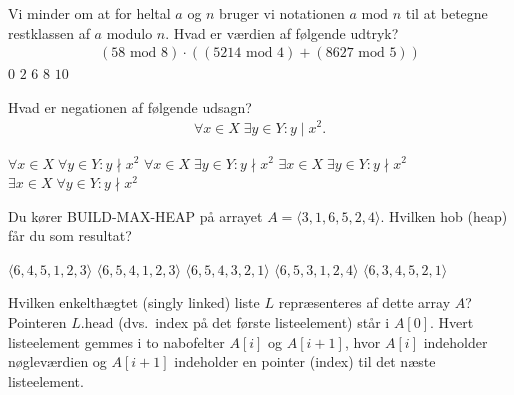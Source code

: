 Vi minder om at for heltal $a$ og $n$ bruger vi notationen $a\text{ mod }n$ til at betegne restklassen af \(a\) modulo \(n\).
Hvad er værdien af følgende udtryk?
\begin{align*}
  (58\text{ mod }8) \cdot \left((5214\text{ mod }4)+ (8627\text{ mod }5)\right)
\end{align*}
\etsvar
\mulighederstart
\svar \(0\) 
\svar \(2\)
\svar \(6\)
\svar \(8\) \korrekt
\svar \(10\)
\mulighederslut
{}

Hvad er negationen af følgende udsagn?
\begin{align*}
  \forall x \in X \; \exists y \in Y : y \mid x^{2}.
\end{align*}
\etsvar

\mulighederstart
\svar \(\forall x \in X \; \forall y \in Y : y \nmid x^{2}\)
\svar \(\forall x \in X \; \exists y \in Y : y \nmid x^{2}\)
\svar \(\exists x \in X \; \exists y \in Y : y \nmid x^{2}\)
\svar \(\exists x \in X \; \forall y \in Y : y \nmid x^{2}\) \korrekt
\mulighederslut
{}

Du kører BUILD-MAX-HEAP på arrayet \(A = \langle 3, 1, 6, 5, 2, 4 \rangle\).
Hvilken hob (heap) får du som resultat?
\etsvar

\mulighederstart
\svar \(\langle 6, 4, 5, 1, 2, 3 \rangle\)
\svar \(\langle 6, 5, 4, 1, 2, 3 \rangle\) \korrekt
\svar \(\langle 6, 5, 4, 3, 2, 1 \rangle\)
\svar \(\langle 6, 5, 3, 1, 2, 4 \rangle\)
\svar \(\langle 6, 3, 4, 5, 2, 1 \rangle\)
\mulighederslut
{}



Hvilken enkelthægtet (singly linked) liste \(L\) repræsenteres af dette array \(A\)? Pointeren \(L.\text{head}\)  (dvs.~index på det første listeelement) står i \(A[0]\).
Hvert listeelement gemmes i to nabofelter \(A[i]\) og \(A[i+1]\), hvor \(A[i]\) indeholder
nøgleværdien og \(A[i+1]\) indeholder en pointer (index) til det næste listeelement.

